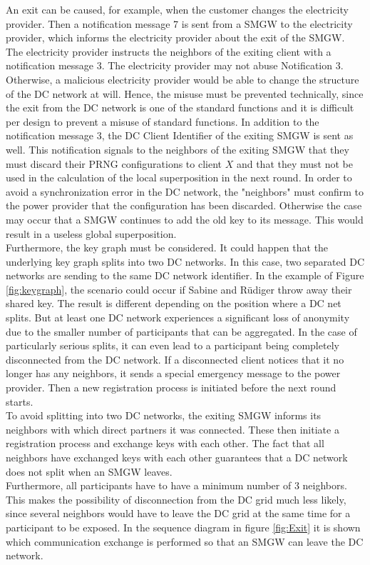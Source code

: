 An exit can be caused, for example, when the customer changes the electricity provider. Then a notification message 7 is sent from a \gls{SMGW} to the electricity provider, which informs the electricity provider about the exit of the \gls{SMGW}. The electricity provider instructs the neighbors of the exiting client with a notification message 3. The electricity provider may not abuse Notification 3. Otherwise, a malicious electricity provider would be able to change the structure of the DC network at will. Hence, the misuse must be prevented technically, since the exit from the DC network is one of the standard functions and it is difficult per design to prevent a misuse of standard functions. In addition to the notification message 3, the DC Client Identifier of the exiting \gls{SMGW} is sent as well. This notification signals to the neighbors of the exiting \gls{SMGW} that they must discard their PRNG configurations to client $X$ and that they must not be used in the calculation of the local superposition in the next round. In order to avoid a synchronization error in the DC network, the "neighbors" must confirm to the power provider that the configuration has been discarded. Otherwise the case may occur that a \gls{SMGW} continues to add the old key to its message. This would result in a useless global superposition.\\ Furthermore, the key graph must be considered. It could happen that the underlying key graph splits into two DC networks. In this case, two separated DC networks are sending to the same DC network identifier. In the example of Figure \ref{fig:keygraph}, the scenario could occur if Sabine and Rüdiger throw away their shared key. The result is different depending on the position where a DC net splits. But at least one DC network experiences a significant loss of anonymity due to the smaller number of participants that can be aggregated. In the case of particularly serious splits, it can even lead to a participant being completely disconnected from the DC network. If a disconnected client notices that it no longer has any neighbors, it sends a special emergency message to the power provider. Then a new registration process is initiated before the next round starts.\\ To avoid splitting into two DC networks, the exiting \gls{SMGW} informs its neighbors with which direct partners it was connected. These then initiate a registration process and exchange keys with each other. The fact that all neighbors have exchanged keys with each other guarantees that a DC network does not split when an \gls{SMGW} leaves.\\ Furthermore, all participants have to have a minimum number of 3 neighbors. This makes the possibility of disconnection from the DC grid much less likely, since several neighbors would have to leave the DC grid at the same time for a participant to be exposed. In the sequence diagram in figure \ref{fig:Exit} it is shown which communication exchange is performed so that an \gls{SMGW} can leave the DC network.
